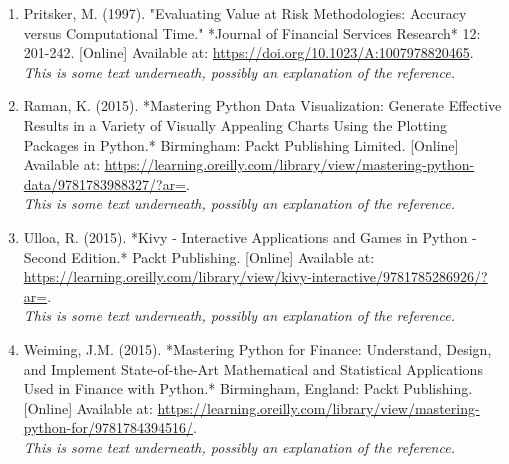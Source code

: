 \documentclass{article}
\begin{document}
\begin{enumerate}
  \item Pritsker, M. (1997). "Evaluating Value at Risk Methodologies: Accuracy versus Computational Time." *Journal of Financial Services Research* 12: 201-242. [Online] Available at: \url{https://doi.org/10.1023/A:1007978820465}.
  \\\textit{This is some text underneath, possibly an explanation of the reference.}

  \item Raman, K. (2015). *Mastering Python Data Visualization: Generate Effective Results in a Variety of Visually Appealing Charts Using the Plotting Packages in Python.* Birmingham: Packt Publishing Limited. [Online] Available at: \url{https://learning.oreilly.com/library/view/mastering-python-data/9781783988327/?ar=}.
  \\\textit{This is some text underneath, possibly an explanation of the reference.}

  \item Ulloa, R. (2015). *Kivy - Interactive Applications and Games in Python - Second Edition.* Packt Publishing. [Online] Available at: \url{https://learning.oreilly.com/library/view/kivy-interactive/9781785286926/?ar=}.
  \\\textit{This is some text underneath, possibly an explanation of the reference.}

  \item Weiming, J.M. (2015). *Mastering Python for Finance: Understand, Design, and Implement State-of-the-Art Mathematical and Statistical Applications Used in Finance with Python.* Birmingham, England: Packt Publishing. [Online] Available at: \url{https://learning.oreilly.com/library/view/mastering-python-for/9781784394516/}.
  \\\textit{This is some text underneath, possibly an explanation of the reference.}
\end{enumerate}



\end{document}
